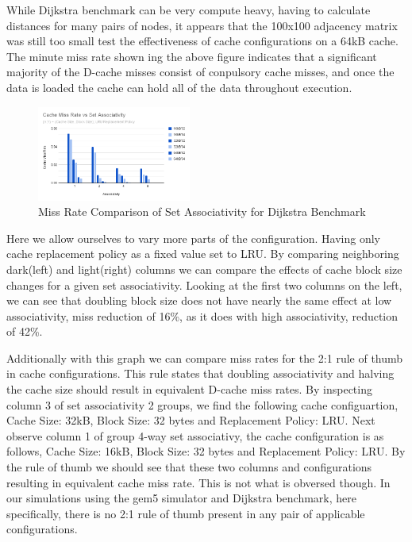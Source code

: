 \documentclass[conference]{IEEEtran}
\begin{document}
While Dijkstra benchmark can be very compute heavy, having to calculate distances for many pairs of nodes, it appears that the 100x100 adjacency matrix was still too small test the effectiveness of cache configurations on a 64kB cache. The minute miss rate shown ing the above figure indicates that a significant majority of the D-cache misses consist of conpulsory cache misses, and once the data is loaded the cache can hold all of the data throughout execution.

\begin{figure}[H]
  \centering
  \includegraphics[width=0.45\textwidth]{dijkstraFigures/CacheMissRatevsSetAssociativity.png}
  \caption{Miss Rate Comparison of Set Associativity for Dijkstra Benchmark}
  \label{fig:MissRateVsAssoc}
\end{figure}

Here we allow ourselves to vary more parts of the configuration. Having only cache replacement policy as a fixed value set to LRU. By comparing neighboring dark(left) and light(right) columns we can compare the effects of cache block size changes for a given set associativity. Looking at the first two columns on the left, we can see that doubling block size does not have nearly the same effect at low associativity, miss reduction of 16\%, as it does with high associativity, reduction of 42\%.

Additionally with this graph we can compare miss rates for the 2:1 rule of thumb in cache configurations. This rule states that doubling associativity and halving the cache size should result in equivalent D-cache miss rates. By inspecting column 3 of set associativity 2 groups, we find the following cache configuartion, Cache Size: 32kB, Block Size: 32 bytes and Replacement Policy: LRU. Next observe column 1 of group 4-way set associativy, the cache configuration is as follows, Cache Size: 16kB, Block Size: 32 bytes and Replacement Policy: LRU. By the rule of thumb we should see that these two columns and configurations resulting in equivalent cache miss rate. This is not what is obversed though. In our simulations using the gem5 simulator and Dijkstra benchmark, here specifically, there is no 2:1 rule of thumb present in any pair of applicable configurations.
\end{document}
